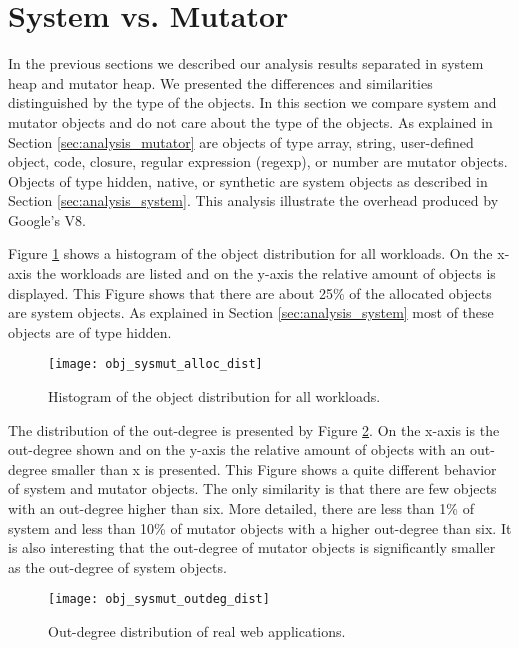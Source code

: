 
\section{System vs. Mutator} \label{sec:analysis_sys_vs_mut}

In the previous sections we described our analysis results separated in system heap and mutator heap. We presented the differences and similarities distinguished by the type of the objects. In this section we compare system and mutator objects and do not care about the type of the objects. As explained in Section \ref{sec:analysis_mutator} are objects of type array, string, user-defined object, code, closure, regular expression (regexp), or number are mutator objects. Objects of type hidden, native, or synthetic are system objects as described in Section \ref{sec:analysis_system}. This analysis illustrate the overhead produced by Google's V8. 

Figure \ref{fig:obj_sysmut_alloc_dist} shows a histogram of the object distribution for all workloads. On the x-axis the workloads are listed and on the y-axis the relative amount of objects is displayed. This Figure shows that there are about 25\% of the allocated objects are system objects. As explained in Section \ref{sec:analysis_system} most of these objects are of type hidden. 
\begin{figure}
	\centering
	\texttt{[image: obj\_sysmut\_alloc\_dist]}
	\caption{Histogram of the object distribution for all workloads.}
	\label{fig:obj_sysmut_alloc_dist}
\end{figure}

The distribution of the out-degree is presented by Figure \ref{fig:obj_sysmut_outdeg_dist}. On the x-axis is the out-degree shown and on the y-axis the relative amount of objects with an out-degree smaller than x is presented. This Figure shows a quite different behavior of system and mutator objects. The only similarity is that there are few objects with an out-degree higher than six. More detailed, there are less than 1\% of system and less than 10\% of mutator objects with a higher out-degree than six. It is also interesting that the out-degree of mutator objects is significantly smaller as the out-degree of system objects.
\begin{figure}
	\centering
	\texttt{[image: obj\_sysmut\_outdeg\_dist]}
	\caption{Out-degree distribution of real web applications.}
	\label{fig:obj_sysmut_outdeg_dist}
\end{figure}

